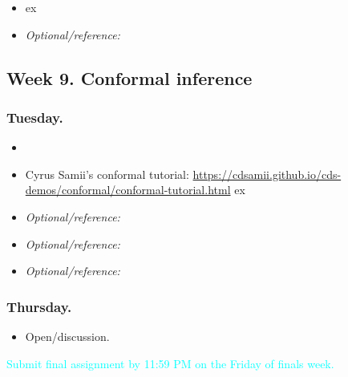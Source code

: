 \documentclass[letterpaper, 12pt, parskip=full,DIV=10]{scrartcl}
\begin{document}
\begin{itemize}
\item {}  ex
\item  \textit{Optional/reference:}  
\end{itemize}

\subsection*{Week 9. Conformal inference}





\subsubsection*{Tuesday.}
\begin{itemize}
\item {} 
\item Cyrus Samii's conformal tutorial: \url{https://cdsamii.github.io/cds-demos/conformal/conformal-tutorial.html}  ex
\item  \textit{Optional/reference:}  
\item  \textit{Optional/reference:}  
\item  \textit{Optional/reference:}  
\end{itemize}


\subsubsection*{Thursday.}

\begin{itemize}
\item Open/discussion.
\end{itemize}

%
%
%
%

\textcolor{cyan}{Submit final assignment by 11:59 PM on the Friday of finals week.}

\nocite{harshaw2019balancing, xu2022hierarchically}


\end{document}
